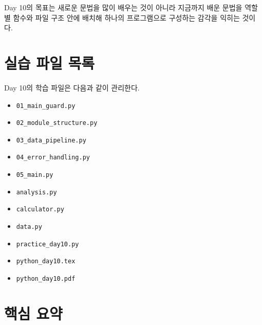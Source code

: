 \documentclass[11pt,a4paper]{article}
\begin{document}
\begin{importantbox}
Day 10의 목표는 새로운 문법을 많이 배우는 것이 아니라 지금까지 배운 문법을 역할별 함수와 파일 구조 안에 배치해 하나의 프로그램으로 구성하는 감각을 익히는 것이다.
\end{importantbox}

\section{실습 파일 목록}

\begin{practicebox}
Day 10의 학습 파일은 다음과 같이 관리한다.
\begin{itemize}[leftmargin=1.5em]
    \item \texttt{01\_main\_guard.py}
    \item \texttt{02\_module\_structure.py}
    \item \texttt{03\_data\_pipeline.py}
    \item \texttt{04\_error\_handling.py}
    \item \texttt{05\_main.py}
    \item \texttt{analysis.py}
    \item \texttt{calculator.py}
    \item \texttt{data.py}
    \item \texttt{practice\_day10.py}
    \item \texttt{python\_day10.tex}
    \item \texttt{python\_day10.pdf}
\end{itemize}
\end{practicebox}

\section{핵심 요약}
\end{document}
